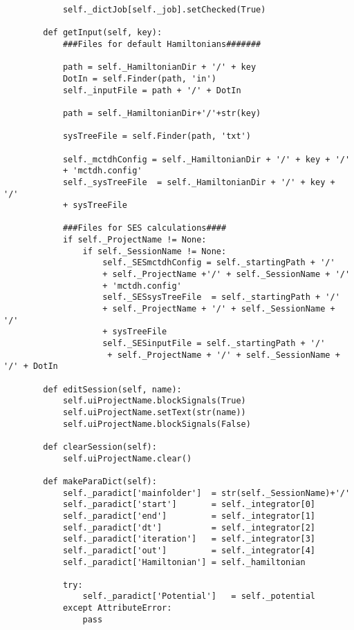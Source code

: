 \begin{verbatim}
            self._dictJob[self._job].setChecked(True)
    
        def getInput(self, key):
            ###Files for default Hamiltonians#######
            
            path = self._HamiltonianDir + '/' + key 
            DotIn = self.Finder(path, 'in')
            self._inputFile = path + '/' + DotIn
            
            path = self._HamiltonianDir+'/'+str(key)
    
            sysTreeFile = self.Finder(path, 'txt')
        
            self._mctdhConfig = self._HamiltonianDir + '/' + key + '/' 
            + 'mctdh.config'
            self._sysTreeFile  = self._HamiltonianDir + '/' + key + '/' 
            + sysTreeFile
    
            ###Files for SES calculations####
            if self._ProjectName != None:
                if self._SessionName != None:
                    self._SESmctdhConfig = self._startingPath + '/' 
                    + self._ProjectName +'/' + self._SessionName + '/' 
                    + 'mctdh.config'
                    self._SESsysTreeFile  = self._startingPath + '/' 
                    + self._ProjectName + '/' + self._SessionName + '/' 
                    + sysTreeFile
                    self._SESinputFile = self._startingPath + '/'
                     + self._ProjectName + '/' + self._SessionName + '/' + DotIn
    
        def editSession(self, name):
            self.uiProjectName.blockSignals(True)
            self.uiProjectName.setText(str(name))
            self.uiProjectName.blockSignals(False)
    
        def clearSession(self):
            self.uiProjectName.clear()
    
        def makeParaDict(self):
            self._paradict['mainfolder']  = str(self._SessionName)+'/'
            self._paradict['start']       = self._integrator[0]
            self._paradict['end']         = self._integrator[1]
            self._paradict['dt']          = self._integrator[2]
            self._paradict['iteration']   = self._integrator[3]
            self._paradict['out']         = self._integrator[4]
            self._paradict['Hamiltonian'] = self._hamiltonian
    
            try:
                self._paradict['Potential']   = self._potential
            except AttributeError:
                pass
    

\end{verbatim}
